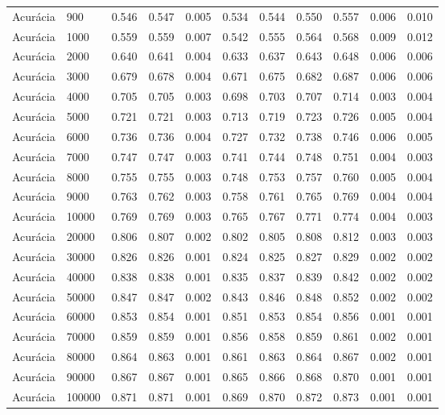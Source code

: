 \begin{table}[htbp]
\begin{table}
\begin{tabular}{ll|rrrrrrr|rr}
Acurácia & 900 & 0.546 & 0.547 & 0.005 & 0.534 & 0.544 & 0.550 & 0.557 & 0.006 & 0.010 \\
Acurácia & 1000 & 0.559 & 0.559 & 0.007 & 0.542 & 0.555 & 0.564 & 0.568 & 0.009 & 0.012 \\
Acurácia & 2000 & 0.640 & 0.641 & 0.004 & 0.633 & 0.637 & 0.643 & 0.648 & 0.006 & 0.006 \\
Acurácia & 3000 & 0.679 & 0.678 & 0.004 & 0.671 & 0.675 & 0.682 & 0.687 & 0.006 & 0.006 \\
Acurácia & 4000 & 0.705 & 0.705 & 0.003 & 0.698 & 0.703 & 0.707 & 0.714 & 0.003 & 0.004 \\
Acurácia & 5000 & 0.721 & 0.721 & 0.003 & 0.713 & 0.719 & 0.723 & 0.726 & 0.005 & 0.004 \\
Acurácia & 6000 & 0.736 & 0.736 & 0.004 & 0.727 & 0.732 & 0.738 & 0.746 & 0.006 & 0.005 \\
Acurácia & 7000 & 0.747 & 0.747 & 0.003 & 0.741 & 0.744 & 0.748 & 0.751 & 0.004 & 0.003 \\
Acurácia & 8000 & 0.755 & 0.755 & 0.003 & 0.748 & 0.753 & 0.757 & 0.760 & 0.005 & 0.004 \\
Acurácia & 9000 & 0.763 & 0.762 & 0.003 & 0.758 & 0.761 & 0.765 & 0.769 & 0.004 & 0.004 \\
Acurácia & 10000 & 0.769 & 0.769 & 0.003 & 0.765 & 0.767 & 0.771 & 0.774 & 0.004 & 0.003 \\
Acurácia & 20000 & 0.806 & 0.807 & 0.002 & 0.802 & 0.805 & 0.808 & 0.812 & 0.003 & 0.003 \\
Acurácia & 30000 & 0.826 & 0.826 & 0.001 & 0.824 & 0.825 & 0.827 & 0.829 & 0.002 & 0.002 \\
Acurácia & 40000 & 0.838 & 0.838 & 0.001 & 0.835 & 0.837 & 0.839 & 0.842 & 0.002 & 0.002 \\
Acurácia & 50000 & 0.847 & 0.847 & 0.002 & 0.843 & 0.846 & 0.848 & 0.852 & 0.002 & 0.002 \\
Acurácia & 60000 & 0.853 & 0.854 & 0.001 & 0.851 & 0.853 & 0.854 & 0.856 & 0.001 & 0.001 \\
Acurácia & 70000 & 0.859 & 0.859 & 0.001 & 0.856 & 0.858 & 0.859 & 0.861 & 0.002 & 0.001 \\
Acurácia & 80000 & 0.864 & 0.863 & 0.001 & 0.861 & 0.863 & 0.864 & 0.867 & 0.002 & 0.001 \\
Acurácia & 90000 & 0.867 & 0.867 & 0.001 & 0.865 & 0.866 & 0.868 & 0.870 & 0.001 & 0.001 \\
Acurácia & 100000 & 0.871 & 0.871 & 0.001 & 0.869 & 0.870 & 0.872 & 0.873 & 0.001 & 0.001 \\

\end{tabular}
\end{table}
\end{table}
